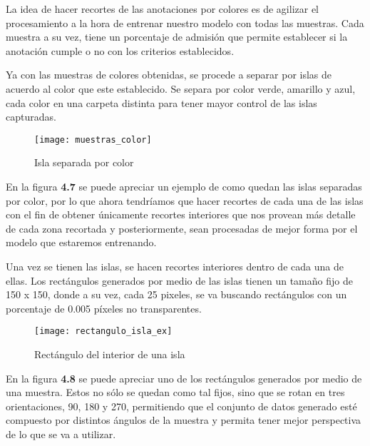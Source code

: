 La idea de hacer recortes de las anotaciones por colores es de agilizar el procesamiento a la hora de entrenar nuestro modelo con todas las muestras. Cada muestra a su vez, tiene un porcentaje de admisión que permite establecer si la anotación cumple o no con los criterios establecidos.

Ya con las muestras de colores obtenidas, se procede a separar por islas de acuerdo al color que este establecido. Se separa por color verde, amarillo y azul, cada color en una carpeta distinta para tener mayor control de las islas capturadas.

\begin{figure}[H]
  \centering
  \begin{minipage}[b]{0.5\textwidth}
        \texttt{[image: muestras\_color]}
    \caption{Isla separada por color}
  \end{minipage}
\end{figure}

En la figura \textbf{4.7} se puede apreciar un ejemplo de como quedan las islas separadas por color, por lo que ahora tendríamos que hacer recortes de cada una de las islas con el fin de obtener únicamente recortes interiores que nos provean más detalle de cada zona recortada y posteriormente, sean procesadas de mejor forma por el modelo que estaremos entrenando. \\

\break

Una vez se tienen las islas, se hacen recortes interiores dentro de cada una de ellas. Los rectángulos generados por medio de las islas tienen un tamaño fijo de 150 x 150, donde a su vez, cada 25 pixeles, se va buscando rectángulos con un porcentaje de 0.005 píxeles no transparentes.


\begin{figure}[h]
  \centering
  \begin{minipage}[b]{0.7\textwidth}
        \texttt{[image: rectangulo\_isla\_ex]}
    \caption{Rectángulo del interior de una isla}
  \end{minipage}
\end{figure}


En la figura \textbf{4.8} se puede apreciar uno de los rectángulos generados por medio de una muestra. Estos no sólo se quedan como tal fijos, sino que se rotan en tres orientaciones, 90, 180 y 270, permitiendo que el conjunto de datos generado esté compuesto por distintos ángulos de la muestra y permita tener mejor perspectiva de lo que se va a utilizar.

